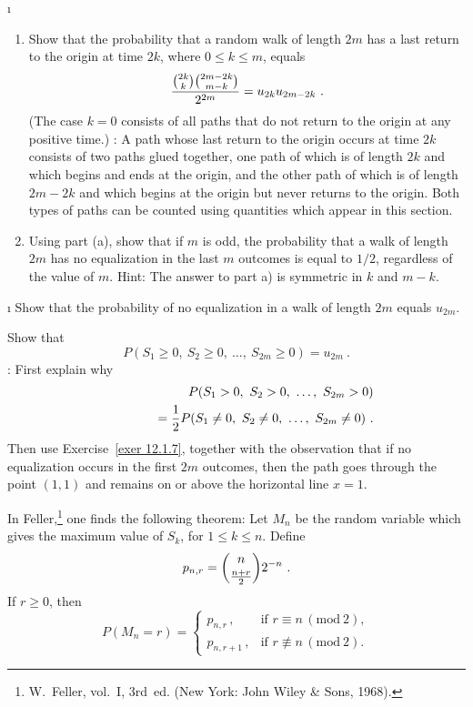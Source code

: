 \begin{LJSItem}
\i\label{exer 12.1.6} 
\begin{enumerate}
\item 
Show that the probability that a random walk of length $2m$ has a last return to the origin
at time $2k$, where $0 \le k \le m$, equals
$$
{{{2k}\choose k}{{2m-2k}\choose {m-k}}\over{2^{2m}}} = u_{2k}u_{2m - 2k}\ .
$$  
(The case $k = 0$ consists of all paths that do not
return to the origin at any positive time.) :  A path whose last return to the origin
occurs at time $2k$ consists of two paths glued together, one path of which is of length $2k$ and
which begins and ends at the origin, and the other path of which is of length $2m - 2k$ and which
begins at the origin but never returns to the origin.  Both types of paths can be counted using
quantities which appear in this section.  
\item
Using part (a), show that if $m$ is odd, the probability that a walk of length $2m$ has no
equalization in the last $m$ outcomes is equal to $1/2$, regardless of the value of $m$.  \emx
{Hint}:  The answer to part a) is symmetric in $k$ and $m-k$.
\end{enumerate}

\i\label{exer 12.1.7} Show that the probability of no equalization in a walk of length
$2m$ equals $u_{2m}$.

\istar\label{exer 12.1.8} Show that
$$P(S_1 \ge 0,\ S_2 \ge 0,\ \ldots,\ S_{2m} \ge 0) = u_{2m}\ .$$
:  First explain why
\begin{eqnarray*}
&&P(S_1 > 0,\ S_2 > 0,\ \ldots,\ S_{2m} > 0) \\
&& \;\;\;\;\;\;\;\;\;\;\;\;\; = {1\over 2}P(S_1 \ne 0,\ S_2 \ne 0,\ \ldots,\ S_{2m} \ne 0)  \ .
\end{eqnarray*}
Then use Exercise~\ref{exer 12.1.7}, together with the observation that if no equalization occurs in the
first $2m$ outcomes, then the path goes through the point $(1,1)$ and remains on or above the
horizontal line $x = 1$.

\istar\label{exer 12.1.9} In Feller,\footnote{W.~Feller,  vol.~I, 3rd~ed. (New York: John Wiley \& Sons, 1968).} one finds the
following theorem:  Let $M_n$ be the random variable which gives the maximum value of $S_k$, for
$1 \le k \le n$.  Define
$$p_{n, r} = {n\choose {{n+r}\over{2}}}2^{-n}\ .$$
If $r \ge 0$, then
$$P(M_n = r) = \left \{ \begin{array}{ll}
                    p_{n, r}\,,&\mbox{if $r \equiv n\,    (\mbox{mod}\ 2)$}, \\   
                  p_{n, r+1}\,,&\mbox{if $r \not\equiv n\,(\mbox{mod}\ 2)$}.
                      \end{array}
             \right.   
$$


\end{LJSItem}
